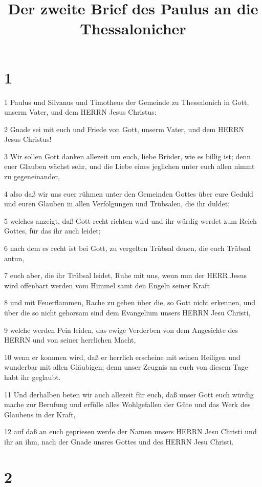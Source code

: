 

\title{Der zweite Brief des Paulus an die Thessalonicher}


\chapter{1}

\par 1 Paulus und Silvanus und Timotheus der Gemeinde zu Thessalonich in Gott, unserm Vater, und dem HERRN Jesus Christus:
\par 2 Gnade sei mit euch und Friede von Gott, unserm Vater, und dem HERRN Jesus Christus!
\par 3 Wir sollen Gott danken allezeit um euch, liebe Brüder, wie es billig ist; denn euer Glauben wächst sehr, und die Liebe eines jeglichen unter euch allen nimmt zu gegeneinander,
\par 4 also daß wir uns euer rühmen unter den Gemeinden Gottes über eure Geduld und euren Glauben in allen Verfolgungen und Trübsalen, die ihr duldet;
\par 5 welches anzeigt, daß Gott recht richten wird und ihr würdig werdet zum Reich Gottes, für das ihr auch leidet;
\par 6 nach dem es recht ist bei Gott, zu vergelten Trübsal denen, die euch Trübsal antun,
\par 7 euch aber, die ihr Trübsal leidet, Ruhe mit uns, wenn nun der HERR Jesus wird offenbart werden vom Himmel samt den Engeln seiner Kraft
\par 8 und mit Feuerflammen, Rache zu geben über die, so Gott nicht erkennen, und über die so nicht gehorsam sind dem Evangelium unsers HERRN Jesu Christi,
\par 9 welche werden Pein leiden, das ewige Verderben von dem Angesichte des HERRN und von seiner herrlichen Macht,
\par 10 wenn er kommen wird, daß er herrlich erscheine mit seinen Heiligen und wunderbar mit allen Gläubigen; denn unser Zeugnis an euch von diesem Tage habt ihr geglaubt.
\par 11 Und derhalben beten wir auch allezeit für euch, daß unser Gott euch würdig mache zur Berufung und erfülle alles Wohlgefallen der Güte und das Werk des Glaubens in der Kraft,
\par 12 auf daß an euch gepriesen werde der Namen unsers HERRN Jesu Christi und ihr an ihm, nach der Gnade unsres Gottes und des HERRN Jesu Christi.

\chapter{2}

